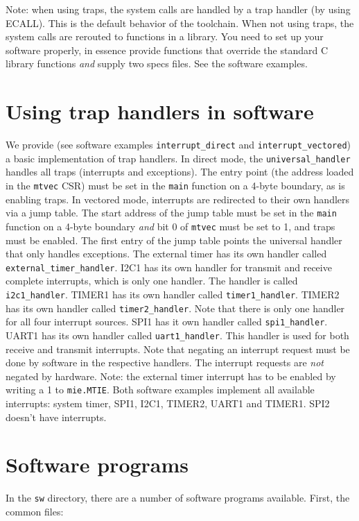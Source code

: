 \documentclass[12pt]{article}
\begin{document}
Note: when using traps, the system calls are handled by a trap handler (by using ECALL). This is the default behavior of the toolchain. When not using traps, the system calls are rerouted to functions in a library. You need to set up your software properly, in essence provide functions that override the standard C library functions \textit{and} supply two specs files. See the software examples.

\section{Using trap handlers in software}
We provide (see software examples \lstinline|interrupt_direct| and \lstinline|interrupt_vectored|) a basic implementation of trap handlers. In direct mode, the \lstinline|universal_handler| handles all traps (interrupts and exceptions). The entry point (the address loaded in the \lstinline|mtvec| CSR) must be set in the \lstinline|main| function on a 4-byte boundary, as is enabling traps. In vectored mode, interrupts are redirected to their own handlers via a jump table. The start address of the jump table must be set in the \lstinline|main| function on a 4-byte boundary \textit{and} bit 0 of \lstinline|mtvec| must be set to 1, and traps must be enabled. The first entry of the jump table points the universal handler that only handles exceptions. The external timer has its own handler called \lstinline|external_timer_handler|. I2C1 has its own handler for transmit and receive complete interrupts, which is only one handler. The handler is called \lstinline|i2c1_handler|. TIMER1 has its own handler called \lstinline|timer1_handler|. TIMER2 has its own handler called \lstinline|timer2_handler|. Note that there is only one handler for all four interrupt sources. SPI1 has it own handler called \lstinline|spi1_handler|. UART1 has its own handler called \lstinline|uart1_handler|. This handler is used for both receive and transmit interrupts. Note that negating an interrupt request must be done by software in the respective handlers. The interrupt requests are \emph{not} negated by hardware. Note: the external timer interrupt has to be enabled by writing a 1 to \lstinline|mie.MTIE|. Both software examples implement all available interrupts: system timer, SPI1, I2C1, TIMER2, UART1 and TIMER1. SPI2 doesn't have interrupts.

\section{Software programs}
In the \lstinline|sw| directory, there are a number of software programs available. First, the common files:
\end{document}
